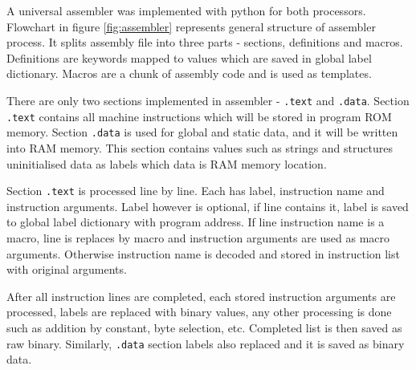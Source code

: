 A universal assembler was implemented with python for both processors. Flowchart in figure \ref{fig:assembler} represents general structure of assembler process. It splits assembly file into three parts - sections, definitions and macros. Definitions are keywords mapped to values which are saved in global label dictionary. Macros are a chunk of assembly code and is used as templates. 

There are only two sections implemented in assembler - \texttt{.text} and \texttt{.data}. Section \texttt{.text} contains all machine instructions which will be stored in program ROM memory. Section \texttt{.data} is used for global and static data, and it will be written into RAM memory. This section contains values such as strings and structures uninitialised data as labels which data is RAM memory location. 

Section \texttt{.text} is processed line by line. Each has label, instruction name and instruction arguments. Label however is optional, if line contains it, label is saved to global label dictionary with program address. If line instruction name is a macro, line is replaces by macro and instruction arguments are used as macro arguments. Otherwise instruction name is decoded and stored in instruction list with original arguments.

After all instruction lines are completed, each stored instruction arguments are processed, labels are replaced with binary values, any other processing is done such as addition by constant, byte selection, etc. Completed list is then saved as raw binary. Similarly, \texttt{.data} section labels also replaced and it is saved as binary data.

